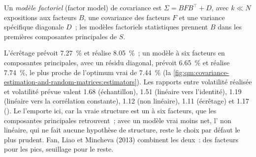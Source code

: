 \begin{definition}\label{def:qm:covariance-estimation-and-random-matrices:factor}
Un \emph{modèle factoriel} (factor model) de covariance est $\Sigma = BF B^\top + D$, avec $k \ll N$ expositions aux facteurs $B$, une covariance des facteurs $F$ et une variance spécifique diagonale $D$~; les modèles
factoriels statistiques prennent $B$ dans les premières composantes principales de $S$.
\end{definition}

L'écrêtage prévoit 7.27~\% et réalise 8.05~\%~; un modèle à six facteurs en composantes principales, avec un résidu diagonal, prévoit 6.65~\% et réalise 7.74~\%, le plus proche de l'optimum vrai de 7.44~\%
(la \cref{fig:qm:covariance-estimation-and-random-matrices:estimators}). Les rapports entre volatilité réalisée et volatilité prévue valent 1.68 (échantillon), 1.51 (linéaire vers l'identité), 1.19 (linéaire vers
la corrélation constante), 1.12 (non linéaire), 1.11 (écrêtage) et 1.17 (). Le  l'emporte ici, car la vraie structure est un  à six facteurs, que les composantes principales
retrouvent~; avec un modèle vrai moins net, l' non linéaire, qui ne fait aucune hypothèse de structure, reste le choix par défaut le plus prudent. Fan, Liao et Mincheva (2013) combinent les deux~: des facteurs
pour les pics, seuillage pour le reste.

